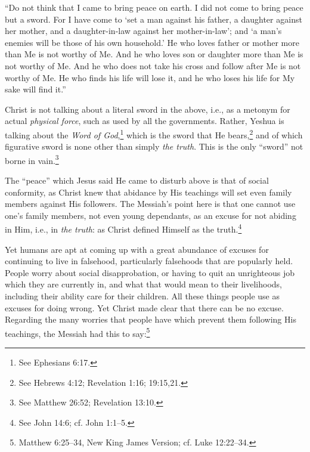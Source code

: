 \documentclass[letterpaper,12pt]{article}
\newenvironment{squote}
  {\small\quote}
  {\endquote\normalsize}
\begin{document}
\begin{squote}
``Do not think that I came to bring peace on earth. I did not come to bring peace but a sword. For I have come to `set a man against his father, a daughter against her mother, and a daughter-in-law against her mother-in-law'; and `a man's enemies will be those of his own household.' He who loves father or mother more than Me is not worthy of Me. And he who loves son or daughter more than Me is not worthy of Me. And he who does not take his cross and follow after Me is not worthy of Me. He who finds his life will lose it, and he who loses his life for My sake will find it.''
\end{squote}

Christ is not talking about a literal sword in the above, i.e., as a metonym for actual \emph{physical force}, such as used by all the governments. Rather, Yeshua is talking about the \emph{Word of God},\footnote{See Ephesians 6:17.} which is the sword that He bears,\footnote{See Hebrews 4:12; Revelation 1:16; 19:15,21.} and of which figurative sword is none other than simply \emph{the truth}. This is the only ``sword'' not borne in vain.\footnote{See Matthew 26:52; Revelation 13:10.}

The ``peace'' which Jesus said He came to disturb above is that of social conformity, as Christ knew that abidance by His teachings will set even family members against His followers. The Messiah's point here is that one cannot use one's family members, not even young dependants, as an excuse for not abiding in Him, i.e., in \emph{the truth}: as Christ defined Himself as the truth.\footnote{See John 14:6; cf. John 1:1--5.}

Yet humans are apt at coming up with a great abundance of excuses for continuing to live in falsehood, particularly falsehoods that are popularly held. People worry about social disapprobation, or having to quit an unrighteous job which they are currently in, and what that would mean to their livelihoods, including their ability care for their children. All these things people use as excuses for doing wrong. Yet Christ made clear that there can be no excuse. Regarding the many worries that people have which prevent them following His teachings, the Messiah had this to say:\footnote{Matthew 6:25--34, New King James Version; cf. Luke 12:22--34.}
\end{document}
